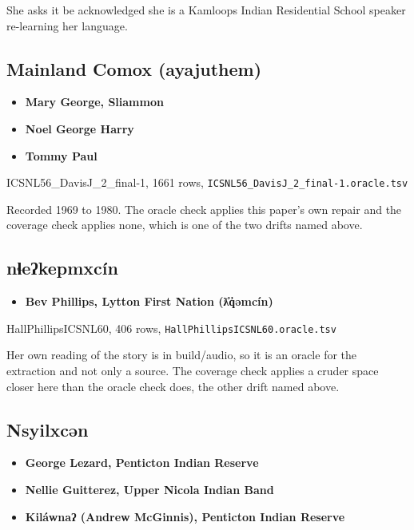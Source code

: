 She asks it be acknowledged she is a Kamloops Indian Residential School speaker re-learning her language.

\subsection{Mainland Comox (ayajuthem)}

\begin{itemize}
\item \textbf{Mary George, Sliammon}
\item \textbf{Noel George Harry}
\item \textbf{Tommy Paul}
\end{itemize}

ICSNL56\_DavisJ\_2\_final-1, 1661 rows, \texttt{ICSNL56\_\allowbreak{}Davis\allowbreak{}J\_\allowbreak{}2\_\allowbreak{}final-\allowbreak{}1.\allowbreak{}oracle.\allowbreak{}tsv}

Recorded 1969 to 1980. The oracle check applies this paper's own repair and the coverage check applies none, which is one of the two drifts named above.

\subsection{nɬeʔkepmxcín}

\begin{itemize}
\item \textbf{Bev Phillips, Lytton First Nation (ƛ̓q̓əmcín)}
\end{itemize}

HallPhillipsICSNL60, 406 rows, \texttt{Hall\allowbreak{}Phillips\allowbreak{}ICSNL60.\allowbreak{}oracle.\allowbreak{}tsv}

Her own reading of the story is in build/audio, so it is an oracle for the extraction and not only a source. The coverage check applies a cruder space closer here than the oracle check does, the other drift named above.

\subsection{Nsyilxcən}

\begin{itemize}
\item \textbf{George Lezard, Penticton Indian Reserve}
\item \textbf{Nellie Guitterez, Upper Nicola Indian Band}
\item \textbf{Kiláwnaʔ (Andrew McGinnis), Penticton Indian Reserve}
\end{itemize}


